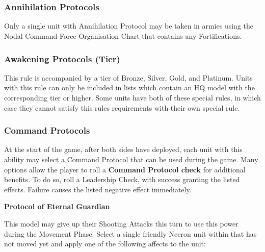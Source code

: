 \section[Necron Rules]{}

\subsection[Special Rules]{}

\begin{multicols}{2}

\subsubsection{Annihilation Protocols} \label{Annihilation Protocols}

Only a single unit with Annihilation Protocol may be taken in armies using the Nodal Command Force Organisation Chart that contains any Fortifications.

\subsubsection{Awakening Protocols (Tier)} \label{Awakening Protocols}

This rule is accompanied by a tier of Bronze, Silver, Gold, and Platinum. Units with this rule can only be included in lists which contain an HQ model with the corresponding  tier or higher. Some units have both of these special rules, in which case they cannot satisfy this rules requirements with their own  special rule.

\subsubsection{Command Protocols} \label{Command Protocols}

At the start of the game, after both sides have deployed, each unit with this ability may select a Command Protocol that can be used during the game. Many options allow the player to roll a \textbf{Command Protocol check} for additional benefits. To do so, roll a Leadership Check, with success granting the listed effects. Failure causes the listed negative effect immediately.

\textbf{Protocol of Eternal Guardian}

This model may give up their Shooting Attacks this turn to use this power during the Movement Phase. Select a single friendly Necron unit within  that has not moved yet and apply one of the following affects to the unit:


\end{multicols}
